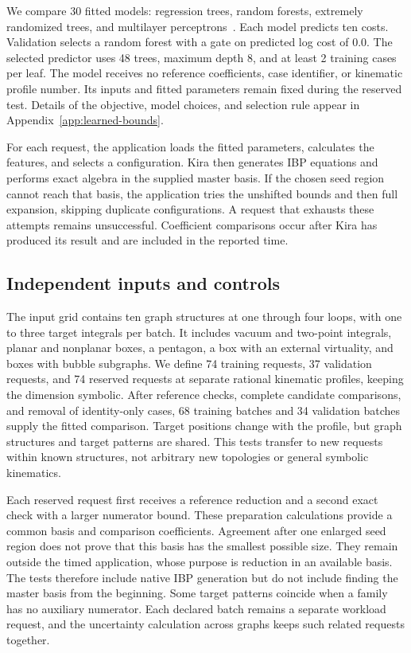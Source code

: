 We compare 30 fitted models: regression trees, random forests, extremely randomized trees, and multilayer perceptrons~\cite{CART1984,Breiman2001Forest,Geurts2006ExtraTrees,Pedregosa2011Bounds}. Each model predicts ten costs. Validation selects a random forest with a gate on predicted log cost of 0.0. The selected predictor uses 48 trees, maximum depth 8, and at least 2 training cases per leaf. The model receives no reference coefficients, case identifier, or kinematic profile number. Its inputs and fitted parameters remain fixed during the reserved test. Details of the objective, model choices, and selection rule appear in Appendix~\ref{app:learned-bounds}.

For each request, the application loads the fitted parameters, calculates the features, and selects a configuration. Kira then generates IBP equations and performs exact algebra in the supplied master basis. If the chosen seed region cannot reach that basis, the application tries the unshifted bounds and then full expansion, skipping duplicate configurations. A request that exhausts these attempts remains unsuccessful. Coefficient comparisons occur after Kira has produced its result and are included in the reported time.

\subsection{Independent inputs and controls}
The input grid contains ten graph structures at one through four loops, with one to three target integrals per batch. It includes vacuum and two-point integrals, planar and nonplanar boxes, a pentagon, a box with an external virtuality, and boxes with bubble subgraphs. We define 74 training requests, 37 validation requests, and 74 reserved requests at separate rational kinematic profiles, keeping the dimension symbolic. After reference checks, complete candidate comparisons, and removal of identity-only cases, 68 training batches and 34 validation batches supply the fitted comparison. Target positions change with the profile, but graph structures and target patterns are shared. This tests transfer to new requests within known structures, not arbitrary new topologies or general symbolic kinematics.

Each reserved request first receives a reference reduction and a second exact check with a larger numerator bound. These preparation calculations provide a common basis and comparison coefficients. Agreement after one enlarged seed region does not prove that this basis has the smallest possible size. They remain outside the timed application, whose purpose is reduction in an available basis. The tests therefore include native IBP generation but do not include finding the master basis from the beginning. Some target patterns coincide when a family has no auxiliary numerator. Each declared batch remains a separate workload request, and the uncertainty calculation across graphs keeps such related requests together.

